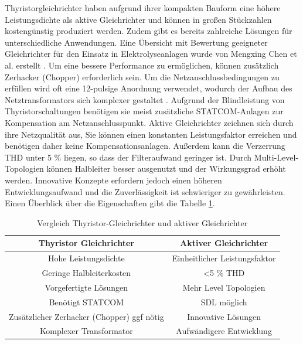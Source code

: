 Thyristorgleichrichter haben aufgrund ihrer kompakten Bauform eine höhere Leistungsdichte als aktive Gleichrichter und können in großen Stückzahlen kostengünstig produziert werden. Zudem gibt es bereits zahlreiche Lösungen für unterschiedliche Anwendungen. Eine Übersicht mit Bewertung geeigneter Gleichrichter für den Einsatz in Elektrolyseanlagen wurde von Mengxing Chen et al. erstellt \cite{HydrogenElectronicTopologies}. Um eine bessere Performance zu ermöglichen, können zusätzlich Zerhacker (Chopper) erforderlich sein. Um die Netzanschlussbedingungen zu erfüllen wird oft eine 12-pulsige Anordnung verwendet, wodurch der Aufbau des Netztransformators sich komplexer gestaltet \cite{HydrogenRectInf}. Aufgrund der Blindleistung von Thyristorschaltungen benötigen sie meist zusätzliche STATCOM-Anlagen zur Kompensation am Netzanschlusspunkt. Aktive Gleichrichter zeichnen sich durch ihre Netzqualität aus, Sie können einen konstanten Leistungsfaktor erreichen und benötigen daher keine Kompensationsanlagen. Außerdem kann die Verzerrung \gls{THD} unter 5 \% liegen, so dass der Filteraufwand geringer ist. Durch Multi-Level-Topologien können Halbleiter besser ausgenutzt und der Wirkungsgrad erhöht werden. Innovative Konzepte erfordern jedoch einen höheren Entwicklungsaufwand und die Zuverlässigkeit ist schwieriger zu gewährleisten. Einen Überblick über die Eigenschaften gibt die Tabelle \ref{tab:thyVSafe}. 
\begin{table}[t]
	\centering
	\caption{Vergleich Thyristor-Gleichrichter und aktiver Gleichrichter}
	\label{tab:thyVSafe}
	\begin{tabular}{c|c} 
		\textbf{Thyristor Gleichrichter} & \textbf{Aktiver Gleichrichter} \\
		\hline
		Hohe Leistungsdichte & Einheitlicher Leistungsfaktor \\
		\hline
		Geringe Halbleiterkosten & <5 \% \gls{THD} \\
		\hline
		Vorgefertigte Lösungen & Mehr Level Topologien  \\
		\hline
		Benötigt STATCOM &  \gls{SDL} möglich \\
		\hline
		Zusätzlicher Zerhacker (Chopper) ggf  nötig & Innovative Lösungen \\
		\hline
		Komplexer Transformator & Aufwändigere Entwicklung \\
	\end{tabular}
\end{table}
